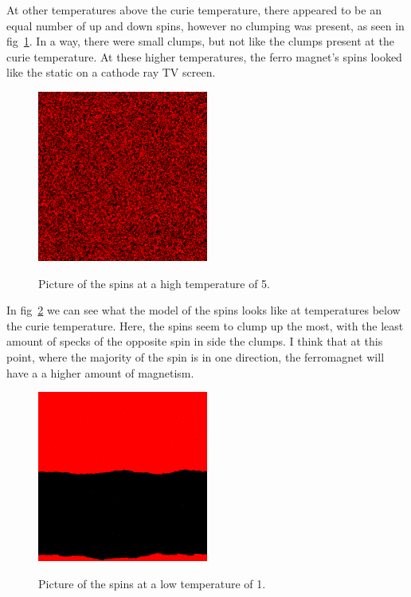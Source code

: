 \documentclass{article}
\begin{document}
 At other temperatures above the curie temperature, there appeared to be an equal number of up and down spins, however no clumping was present, as seen in fig~\ref{higherTemp}. In a way, there were small clumps, but not like the clumps present at the curie temperature. At these higher temperatures, the ferro magnet's spins looked like the static on a cathode ray TV screen. 



\begin{figure}[h]
	\caption{Picture of the spins at a high temperature of 5.}
	\centering
	\includegraphics[width=0.5\textwidth]{HighTemp} \label{higherTemp}
\end{figure}





In fig~\ref{lowTemp} we can see what the model of the spins looks like at temperatures below the curie temperature. Here, the spins seem to clump up the most, with the least amount of specks of the opposite spin in side the clumps. I think that at this point, where the majority of the spin is in one direction, the ferromagnet will have a a higher amount of magnetism.



\begin{figure}[h]
	\caption{Picture of the spins at a low temperature of 1.}
	\centering
	\includegraphics[width=0.5\textwidth]{LowTemp} \label{lowTemp}
\end{figure}
\end{document}
